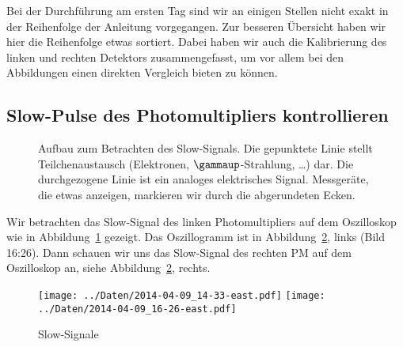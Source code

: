 Bei der Durchführung am ersten Tag sind wir an einigen Stellen nicht exakt in
der Reihenfolge der Anleitung vorgegangen. Zur besseren Übersicht haben wir
hier die Reihenfolge etwas sortiert. Dabei haben wir auch die Kalibrierung des
linken und rechten Detektors zusammengefasst, um vor allem bei den Abbildungen
einen direkten Vergleich bieten zu können.

\subsection{Slow-Pulse des Photomultipliers kontrollieren}

\begin{figure}[htbp]
    \centering
    \caption{%
        Aufbau zum Betrachten des Slow-Signals. Die gepunktete Linie stellt
        Teilchenaustausch (Elektronen, $\gammaup$-Strahlung, …) dar. Die
        durchgezogene Linie ist ein analoges elektrisches Signal. Messgeräte,
        die etwas anzeigen, markieren wir durch die abgerundeten Ecken.
    }
    \label{fig:aufbau:slow}
\end{figure}

Wir betrachten das Slow-Signal des linken Photomultipliers auf dem Oszilloskop
wie in Abbildung~\ref{fig:aufbau:slow} gezeigt. Das Oszillogramm ist in
Abbildung~\ref{fig:slow_signal}, links (Bild 16:26). Dann schauen wir uns das
Slow-Signal des rechten PM auf dem Oszilloskop an, siehe
Abbildung~\ref{fig:slow_signal}, rechts.

\begin{figure}[htbp]
    \centering
    \texttt{[image: ../Daten/2014-04-09\_14-33-east.pdf]}
    \hfill
    \texttt{[image: ../Daten/2014-04-09\_16-26-east.pdf]}
    \caption{%
        Slow-Signale
    }
    \label{fig:slow_signal}
\end{figure}

